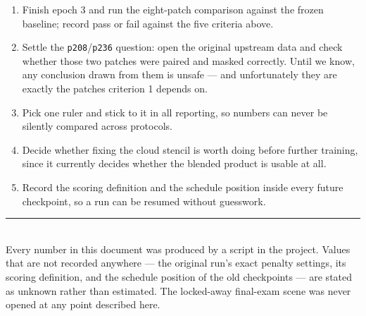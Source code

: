 \documentclass[11pt,a4paper]{article}
\newcommand{\code}[1]{\texttt{#1}}
\begin{document}
\begin{enumerate}
\item Finish epoch 3 and run the eight-patch comparison against the frozen baseline; record
      pass or fail against the five criteria above.
\item Settle the \code{p208}/\code{p236} question: open the original upstream data and check whether
      those two patches were paired and masked correctly. Until we know, any conclusion drawn from
      them is unsafe --- and unfortunately they are exactly the patches criterion 1 depends on.
\item Pick one ruler and stick to it in all reporting, so numbers can never be silently compared
      across protocols.
\item Decide whether fixing the cloud stencil is worth doing before further training, since it
      currently decides whether the blended product is usable at all.
\item Record the scoring definition and the schedule position inside every future checkpoint, so a
      run can be resumed without guesswork.
\end{enumerate}

\vfill
\noindent\rule{\textwidth}{0.3pt}\\
\footnotesize
Every number in this document was produced by a script in the project. Values that are not recorded
anywhere --- the original run's exact penalty settings, its scoring definition, and the schedule
position of the old checkpoints --- are stated as unknown rather than estimated. The locked-away
final-exam scene was never opened at any point described here.
\end{document}
